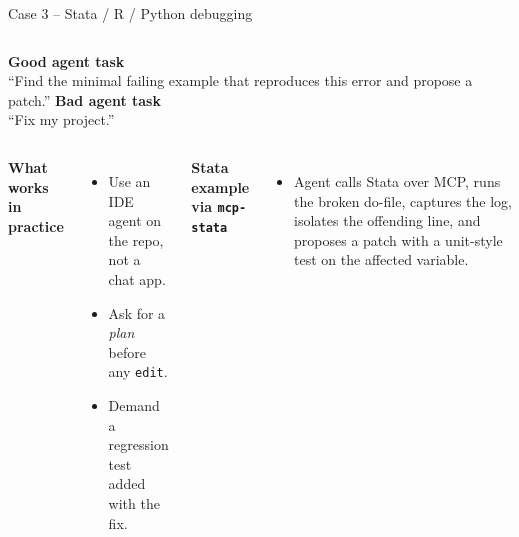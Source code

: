 \begin{frame}{Case 3 -- Stata / R / Python debugging}
  \begin{columns}[T,onlytextwidth]
      \textbf{Good agent task}\\[0.15cm]
      \scriptsize
      ``Find the minimal failing example that reproduces this error and propose a patch.''
      \textbf{Bad agent task}\\[0.15cm]
      \scriptsize
      ``Fix my project.''
  \end{columns}
  \vspace{0.4cm}
  \begin{columns}[T,onlytextwidth]
      \textbf{What works in practice}
      \begin{itemize}\setlength\itemsep{0.25em}
        \item Use an IDE agent on the repo, not a chat app.
        \item Ask for a \emph{plan} before any \texttt{edit}.
        \item Demand a regression test added with the fix.
      \end{itemize}
      \textbf{Stata example via \texttt{mcp-stata}}
      \begin{itemize}\setlength\itemsep{0.25em}
        \item Agent calls Stata over MCP, runs the broken do-file, captures the log, isolates the offending line, and proposes a patch with a unit-style test on the affected variable.
      \end{itemize}
  \end{columns}
  \vspace{0.3cm}
\end{frame}

